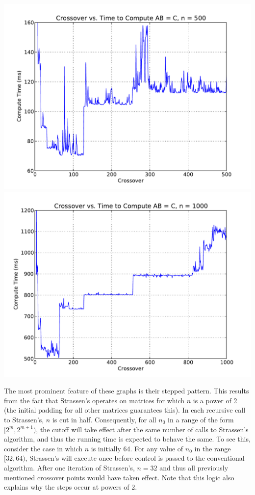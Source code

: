 \documentclass[solution, letterpaper]{cs121}
\begin{document}
\begin{center}
\includegraphics[scale=0.72]{crossover-v-compute-time-500-msec.pdf}
\includegraphics[scale=0.72]{crossover-v-compute-time-1000-msec.pdf}
\end{center}

The most prominent feature of these graphs is their stepped pattern. This results from the fact that Strassen's operates on matrices for which $n$ is a power of 2 (the initial padding for all other matrices guarantees this). In each recursive call to Strassen's, $n$ is cut in half. Consequently, for all $n_0$ in a range of the form $[2^m, 2^{m+1})$, the cutoff will take effect after the same number of calls to Strassen's algorithm, and thus the running time is expected to behave the same. To see this, consider the case in which $n$ is initially 64. For any value of $n_0$ in the range $[32,64)$, Strassen's will execute once before control is passed to the conventional algorithm. After one iteration of Strassen's, $n= 32$ and thus all previously mentioned crossover points would have taken effect. Note that this logic also explains why the steps occur at powers of 2.
\end{document}
